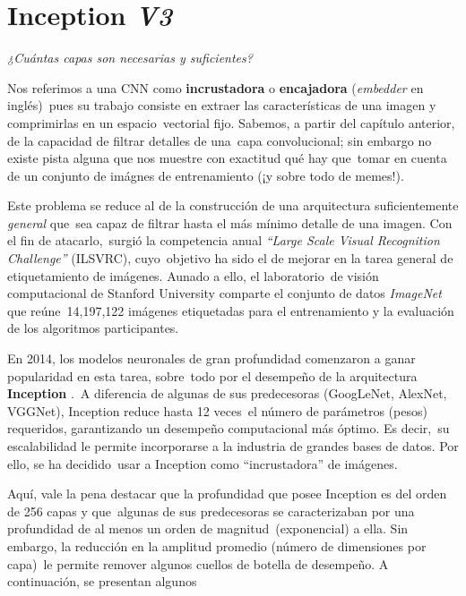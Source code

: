 \section{Inception \emph{V3}}
\label{inception-section}

\begin{center}
  \emph{¿Cuántas capas son necesarias y suficientes?}
\end{center}\par
\noindent
Nos referimos a una CNN como \textbf{incrustadora} o \textbf{encajadora} (\emph{embedder} en inglés)\
pues su trabajo consiste en extraer las características de una imagen y comprimirlas en un espacio\
vectorial fijo. Sabemos, a partir del capítulo anterior, de la capacidad de filtrar detalles de una\
capa convolucional; sin embargo no existe pista alguna que nos muestre con exactitud qué hay que\
tomar en cuenta de un conjunto de imágnes de entrenamiento (¡y sobre todo de memes!).\par
Este problema se reduce al de la construcción de una arquitectura suficientemente \emph{general} que\
sea capaz de filtrar hasta el más mínimo detalle de una imagen. Con el fin de atacarlo,\
surgió la competencia anual \emph{``Large Scale Visual Recognition Challenge''} (ILSVRC), cuyo\
objetivo ha sido el de mejorar en la tarea general de etiquetamiento de imágenes. Aunado a ello, el laboratorio\
de visión computacional de Stanford University comparte el conjunto de datos \emph{ImageNet} que reúne\
14,197,122 imágenes etiquetadas para el entrenamiento y la evaluación de los algoritmos participantes.\par
En 2014, los modelos neuronales de gran profundidad comenzaron a ganar popularidad en esta tarea, sobre\
todo por el desempeño de la arquitectura \textbf{Inception} \cite{DBLP:journals/corr/SzegedyVISW15}.\
A diferencia de algunas de sus predecesoras (GoogLeNet, AlexNet, VGGNet), Inception reduce hasta 12 veces\
el número de parámetros (pesos) requeridos, garantizando un desempeño computacional más óptimo. Es decir,\
su escalabilidad le permite incorporarse a la industria de grandes bases de datos. Por ello, se ha decidido\
usar a Inception como ``incrustadora'' de imágenes.\par
Aquí, vale la pena destacar que la profundidad que posee Inception es del orden de 256 capas y que\
algunas de sus predecesoras se caracterizaban por una profundidad de al menos un orden de magnitud\
(exponencial) a ella. Sin embargo, la reducción en la amplitud promedio (número de dimensiones por capa)\
le permite remover algunos cuellos de botella de desempeño. A continuación, se presentan algunos\
